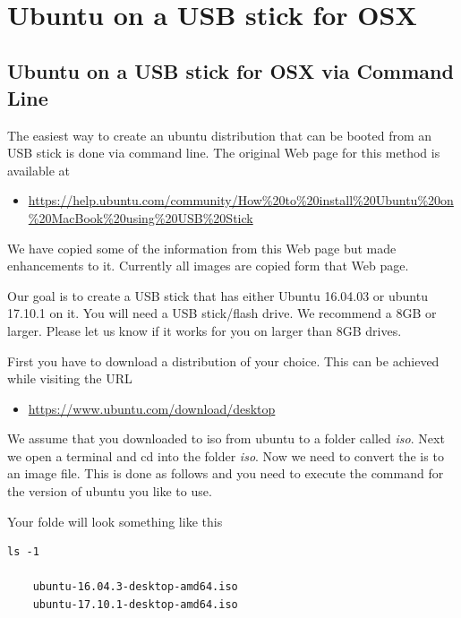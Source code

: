 \MDNAME\

\section{Ubuntu on a USB stick for OSX}

\subsection{Ubuntu on a USB stick for OSX via Command Line}

The easiest way to create an ubuntu distribution that can be booted from
an USB stick is done via command line. The original Web page for this
method is available at

\begin{itemize}
\item
  \url{https://help.ubuntu.com/community/How\%20to\%20install\%20Ubuntu\%20on\%20MacBook\%20using\%20USB\%20Stick}
\end{itemize}

We have copied some of the information from this Web page but made
enhancements to it. Currently all images are copied form that Web page.

Our goal is to create a USB stick that has either Ubuntu 16.04.03 or
ubuntu 17.10.1 on it. You will need a USB stick/flash drive. We
recommend a 8GB or larger. Please let us know if it works for you on
larger than 8GB drives.

First you have to download a distribution of your choice. This can be
achieved while visiting the URL

\begin{itemize}
\item
  \url{https://www.ubuntu.com/download/desktop}
\end{itemize}

We assume that you downloaded to iso from ubuntu to a folder called
\emph{iso}. Next we open a terminal and cd into the folder \emph{iso}.
Now we need to convert the is to an image file. This is done as follows
and you need to execute the command for the version of ubuntu you like
to use.

Your folde will look something like this

\begin{lstlisting}
ls -1

    ubuntu-16.04.3-desktop-amd64.iso
    ubuntu-17.10.1-desktop-amd64.iso
\end{lstlisting}

